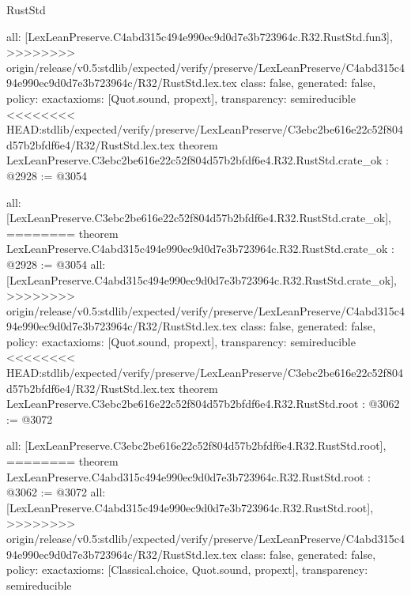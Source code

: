 \begin{lexlean}{RustStd}
\begin{coremodule}
{\begin{coremodule}
{{{{{{{  all: [LexLeanPreserve.C4abd315c494e990ec9d0d7e3b723964c.R32.RustStd.fun3],
>>>>>>>> origin/release/v0.5:stdlib/expected/verify/preserve/LexLeanPreserve/C4abd315c494e990ec9d0d7e3b723964c/R32/RustStd.lex.tex
  class: false,
  generated: false,
  policy: exact{axioms: [Quot.sound, propext]},
  transparency: semireducible
}
<<<<<<<< HEAD:stdlib/expected/verify/preserve/LexLeanPreserve/C3ebc2be616e22c52f804d57b2bfdf6e4/R32/RustStd.lex.tex
theorem LexLeanPreserve.C3ebc2be616e22c52f804d57b2bfdf6e4.R32.RustStd.crate_ok : @2928 := @3054 {
  all: [LexLeanPreserve.C3ebc2be616e22c52f804d57b2bfdf6e4.R32.RustStd.crate_ok],
========
theorem LexLeanPreserve.C4abd315c494e990ec9d0d7e3b723964c.R32.RustStd.crate_ok : @2928 := @3054 {
  all: [LexLeanPreserve.C4abd315c494e990ec9d0d7e3b723964c.R32.RustStd.crate_ok],
>>>>>>>> origin/release/v0.5:stdlib/expected/verify/preserve/LexLeanPreserve/C4abd315c494e990ec9d0d7e3b723964c/R32/RustStd.lex.tex
  class: false,
  generated: false,
  policy: exact{axioms: [Quot.sound, propext]},
  transparency: semireducible
}
<<<<<<<< HEAD:stdlib/expected/verify/preserve/LexLeanPreserve/C3ebc2be616e22c52f804d57b2bfdf6e4/R32/RustStd.lex.tex
theorem LexLeanPreserve.C3ebc2be616e22c52f804d57b2bfdf6e4.R32.RustStd.root : @3062 := @3072 {
  all: [LexLeanPreserve.C3ebc2be616e22c52f804d57b2bfdf6e4.R32.RustStd.root],
========
theorem LexLeanPreserve.C4abd315c494e990ec9d0d7e3b723964c.R32.RustStd.root : @3062 := @3072 {
  all: [LexLeanPreserve.C4abd315c494e990ec9d0d7e3b723964c.R32.RustStd.root],
>>>>>>>> origin/release/v0.5:stdlib/expected/verify/preserve/LexLeanPreserve/C4abd315c494e990ec9d0d7e3b723964c/R32/RustStd.lex.tex
  class: false,
  generated: false,
  policy: exact{axioms: [Classical.choice, Quot.sound, propext]},
  transparency: semireducible
}

}}}}}}}}
\end{coremodule}}
\end{coremodule}
\end{lexlean}
